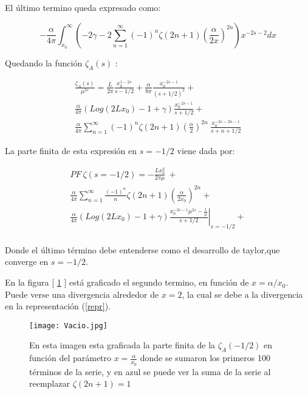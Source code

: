 El último termino queda expresado como:

\begin{equation}
- \frac{\alpha}{4 \pi}
\int _{x_0} ^{\infty}
\left(
-2 \gamma -
2 \sum _{n=1} ^{\infty} 
(-1) ^{n}
\zeta (2n+1) 
\left( \frac{\alpha}{2 x} \right) ^{2n}
\right)
x ^{-2s-2} dx
\end{equation}

Quedando la función $\zeta _A (s) $ :

\begin{equation}
\begin{array}{c}
\frac{\zeta _A (s)}{\mu ^{2s}} = 
\frac{L  }{2 \pi } \frac{ x _0 ^{1-2s} }{s- 1/2} + 
\frac{\alpha  }{8 \pi } \frac{ x_0 ^{-2s-1} }{(s+1/2) ^2} + \\[10pt]


\frac{\alpha  }{4 \pi } 
\left(
Log(2 L x _0 ) -1 + \gamma 
\right)
\frac{x _0 ^{-2s-1}}{s+1/2} + \\[10pt]


\frac{\alpha }{4\pi} 
\sum _{n=1} ^{\infty} (-1) ^{n} \zeta (2n+1) 
( \frac{\alpha}{2 } ) ^{2n} \ \frac{x _0 ^{-2s-2n-1}}{s+n+1/2}
\end{array}
\end{equation}

La parte finita de esta expresión en $s=-1/2$ viene dada por:

\begin{equation}
\begin{array}{c}

PF \ \zeta (s=-1/2) = 

- \frac{L x_0 ^2}{2 \pi \mu} \ + \\[10pt]

\frac{\alpha}{4 \pi} 
						\sum _{n=1} ^{\infty} \frac{(-1) ^n}{n} \zeta (2n+1)
						\left( \frac{\alpha}{2 x_0 } \right) ^{2n}  + \\[10pt]

\frac{\alpha  }{4 \pi } 
\left(
Log(2 L x _0 ) -1 + \gamma 
\right)
\left. \frac{ x _0 ^{-2s-1} \mu ^{2s} -  \frac{1}{\mu}  }{s+1/2} \right| _{s=-1/2}  + \\[10pt]

					

\end{array}
\end{equation}

Donde el último término debe entenderse como el desarrollo de taylor,que converge en $s=-1/2$.


En la figura [ \ref{fig:vacio} ] está graficado el segundo termino, en función de $x = \alpha / x_0$. Puede verse una divergencia alrededor de $x=2$, la cual se debe a la divergencia en la representación (\ref{repr}).

\begin{figure}
    \centering
    \texttt{[image: Vacio.jpg]}
    \caption{En esta imagen esta graficada la parte finita de la $\zeta _A (-1/2) $ en función del parámetro $x= \frac{\alpha}{x _0}$ donde se sumaron los primeros 100 términos de la serie, y en azul se puede ver la suma de la serie al reemplazar $\zeta (2n+1) = 1$}
    \label{fig:vacio}
\end{figure}